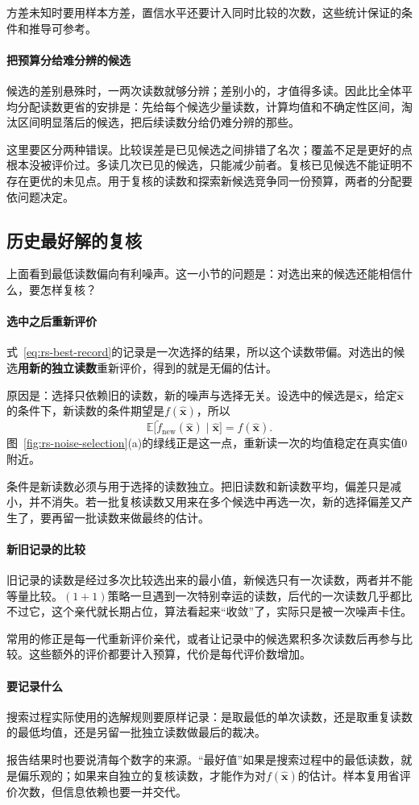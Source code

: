 方差未知时要用样本方差，置信水平还要计入同时比较的次数，这些统计保证的条件和推导可参考。

\paragraph{把预算分给难分辨的候选}
候选的差别悬殊时，一两次读数就够分辨；差别小的，才值得多读。因此比全体平均分配读数更省的安排是：先给每个候选少量读数，计算均值和不确定性区间，淘汰区间明显落后的候选，把后续读数分给仍难分辨的那些。

这里要区分两种错误。比较误差是已见候选之间排错了名次；覆盖不足是更好的点根本没被评价过。多读几次已见的候选，只能减少前者。复核已见候选不能证明不存在更优的未见点。用于复核的读数和探索新候选竞争同一份预算，两者的分配要依问题决定。

\subsection{历史最好解的复核}
\label{sec:rs-noise-reeval}

上面看到最低读数偏向有利噪声。这一小节的问题是：对选出来的候选还能相信什么，要怎样复核？

\paragraph{选中之后重新评价}
式~\eqref{eq:rs-best-record}的记录是一次选择的结果，所以这个读数带偏。对选出的候选\textbf{用新的独立读数}重新评价，得到的就是无偏的估计。

原因是：选择只依赖旧的读数，新的噪声与选择无关。设选中的候选是$\hat{\bm{x}}$，给定$\hat{\bm{x}}$的条件下，新读数的条件期望是$f(\hat{\bm{x}})$，所以
\begin{equation}
 \mathbb{E}\bigl[\tilde f_{\mathrm{new}}(\hat{\bm{x}})\mid\hat{\bm{x}}\bigr]=f(\hat{\bm{x}}).
 \label{eq:rs-fresh-reading}
\end{equation}
图~\ref{fig:rs-noise-selection}(a)的绿线正是这一点，重新读一次的均值稳定在真实值$0$附近。

条件是新读数必须与用于选择的读数独立。把旧读数和新读数平均，偏差只是减小，并不消失。若一批复核读数又用来在多个候选中再选一次，新的选择偏差又产生了，要再留一批读数来做最终的估计。

\paragraph{新旧记录的比较}
旧记录的读数是经过多次比较选出来的最小值，新候选只有一次读数，两者并不能等量比较。$(1+1)$策略一旦遇到一次特别幸运的读数，后代的一次读数几乎都比不过它，这个亲代就长期占位，算法看起来“收敛”了，实际只是被一次噪声卡住。

常用的修正是每一代重新评价亲代，或者让记录中的候选累积多次读数后再参与比较。这些额外的评价都要计入预算，代价是每代评价数增加。

\paragraph{要记录什么}
搜索过程实际使用的选解规则要原样记录：是取最低的单次读数，还是取重复读数的最低均值，还是另留一批独立读数做最后的裁决。

报告结果时也要说清每个数字的来源。“最好值”如果是搜索过程中的最低读数，就是偏乐观的；如果来自独立的复核读数，才能作为对$f(\hat{\bm{x}})$的估计。样本复用省评价次数，但信息依赖也要一并交代。
